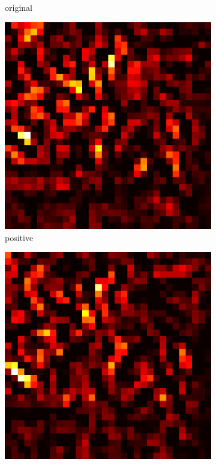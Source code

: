 \documentclass[preprint,12pt]{elsarticle}
\begin{document}
\begin{figure}
\begin{subfigure}{0.14\linewidth}
        \caption{original}
    \end{subfigure}
    \hfill
    \begin{subfigure}{0.14\textwidth}
        \centering
        \includegraphics[width=\linewidth]{../visualizations/examples/cifar10/resnet18/positive_saliency_map/7.png}
        \caption{positive}
    \end{subfigure}
    \hfill
    \begin{subfigure}{0.14\textwidth}
        \centering
        \includegraphics[width=\linewidth]{../visualizations/examples/cifar10/resnet18/negative_saliency_map/7.png}

\end{subfigure}
\end{figure}
\end{document}
